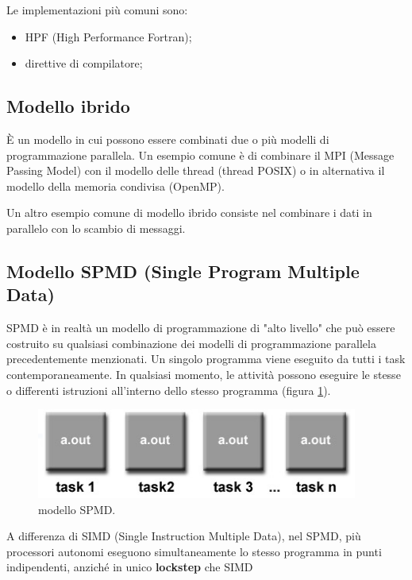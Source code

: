 Le implementazioni più comuni sono:
\begin{itemize}
	\item HPF (High Performance Fortran);
	\item direttive di compilatore;
\end{itemize}

\subsection{Modello ibrido} È un modello in cui possono essere combinati due o più modelli di programmazione parallela. Un esempio comune è di combinare il MPI (Message Passing Model) con il modello delle thread (thread POSIX) o in alternativa il modello della memoria condivisa (OpenMP).

Un altro esempio comune di modello ibrido consiste nel combinare i dati in parallelo con lo scambio di messaggi.
\subsection{Modello SPMD (Single Program Multiple Data)} SPMD è in realtà un modello di programmazione di "alto livello" che può essere costruito su qualsiasi combinazione dei modelli di programmazione parallela precedentemente menzionati. Un singolo programma viene eseguito da tutti i task contemporaneamente. In qualsiasi momento, le attività possono eseguire le stesse o differenti istruzioni all'interno dello stesso programma (figura \ref{fig:spmd}).
\begin{figure}[th]
	\centering
	\includegraphics[width=0.7\linewidth]{img/SPMD}
	\caption{modello SPMD.}
	\label{fig:spmd}
\end{figure}
A differenza di SIMD (Single Instruction Multiple Data), nel SPMD, più processori autonomi eseguono simultaneamente lo stesso programma in punti indipendenti, anziché in unico \textbf{lockstep} che SIMD